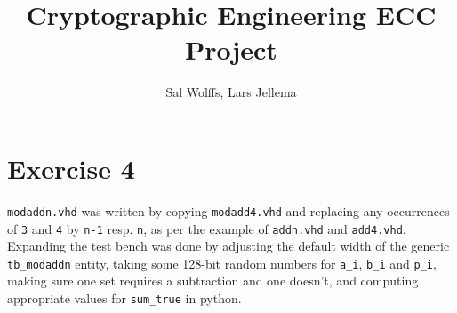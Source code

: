 \documentclass[a4paper,twoside]{article}
\title{Cryptographic Engineering ECC Project}
\author{Sal Wolffs, Lars Jellema}
\newcommand{\atom}[1]{\mbox{\texttt{#1}}}
\begin{document}
\maketitle

\section*{Exercise 4} 
\atom{modaddn.vhd} was written by copying \atom{modadd4.vhd} and replacing any
occurrences of \atom{3} and \atom{4} by \atom{n-1} resp. \atom{n}, as per the
example of \atom{addn.vhd} and \atom{add4.vhd}. Expanding the test bench was
done by adjusting the default width of the generic \atom{tb\_modaddn} entity,
taking some 128-bit random numbers for \atom{a\_i}, \atom{b\_i} and \atom{p\_i},
making sure one set requires a subtraction and one doesn't, and computing
appropriate values for \atom{sum\_true} in python.
\end{document}

